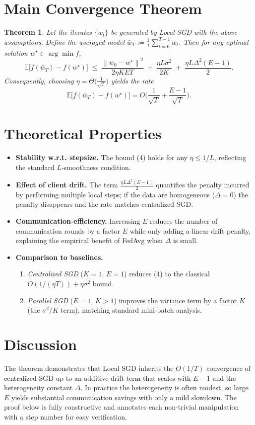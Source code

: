 \documentclass{article}
\newtheorem{theorem}{Theorem}
\newcommand{\E}{\mathbb{E}}
\newcommand{\norm}[1]{\left\|#1\right\|}
\begin{document}
\section*{Main Convergence Theorem}
\begin{theorem}\label{thm:conv}
Let the iterates $\{w_t\}$ be generated by Local SGD with the above assumptions.
Define the averaged model $\bar w_T:=\frac1T\sum_{t=0}^{T-1}w_t$.
Then for any optimal solution $w^\star\in\arg\min f$,
\[
\E\!\big[f(\bar w_T)-f(w^\star)\big]\;\le\;
\frac{\norm{w_0-w^\star}^2}{2\eta KET}
\;+\;
\frac{\eta L\sigma^2}{2K}
\;+\;
\frac{\eta L\Delta^2 (E-1)}{2}.
\tag{4}
\]
Consequently, choosing $\eta=\Theta\!\big(\frac{1}{\sqrt{T}}\big)$ yields the rate
\[
\E\!\big[f(\bar w_T)-f(w^\star)\big]=O\!\Big(\frac{1}{\sqrt{T}}+\frac{E-1}{\sqrt{T}}\Big).
\]
\end{theorem}

\section*{Theoretical Properties}
\begin{itemize}
\item \textbf{Stability w.r.t. stepsize.}  The bound (4) holds for any $\eta\le 1/L$, reflecting the standard $L$‑smoothness condition.
\item \textbf{Effect of client drift.}  The term $\frac{\eta L\Delta^2 (E-1)}{2}$ quantifies the penalty incurred by performing multiple local steps; if the data are homogeneous ($\Delta=0$) the penalty disappears and the rate matches centralized SGD.
\item \textbf{Communication‑efficiency.}  Increasing $E$ reduces the number of communication rounds by a factor $E$ while only adding a linear drift penalty, explaining the empirical benefit of FedAvg when $\Delta$ is small.
\item \textbf{Comparison to baselines.}
    \begin{enumerate}
        \item \emph{Centralized SGD} ($K=1$, $E=1$) reduces (4) to the classical $O(1/(\eta T))+\eta\sigma^2$ bound.
        \item \emph{Parallel SGD} ($E=1$, $K>1$) improves the variance term by a factor $K$ (the $\sigma^2/K$ term), matching standard mini‑batch analysis.
    \end{enumerate}
\end{itemize}

\section*{Discussion}
The theorem demonstrates that Local SGD inherits the $O(1/T)$ convergence of centralized SGD up to an additive drift term that scales with $E-1$ and the heterogeneity constant $\Delta$.  In practice the heterogeneity is often modest, so large $E$ yields substantial communication savings with only a mild slowdown.  The proof below is fully constructive and annotates each non‑trivial manipulation with a step number for easy verification.
\end{document}
